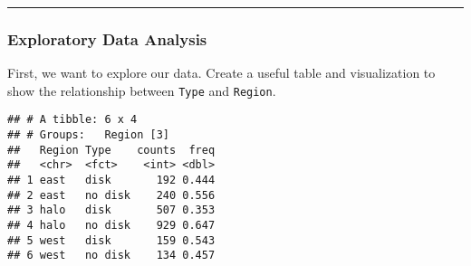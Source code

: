 \documentclass[]{article}
\newenvironment{Shaded}{\begin{snugshade}}{\end{snugshade}}
\newcommand{\CommentTok}[1]{\textcolor[rgb]{0.56,0.35,0.01}{\textit{#1}}}
\newcommand{\DataTypeTok}[1]{\textcolor[rgb]{0.13,0.29,0.53}{#1}}
\newcommand{\KeywordTok}[1]{\textcolor[rgb]{0.13,0.29,0.53}{\textbf{#1}}}
\newcommand{\NormalTok}[1]{#1}
\newcommand{\OperatorTok}[1]{\textcolor[rgb]{0.81,0.36,0.00}{\textbf{#1}}}
\newcommand{\StringTok}[1]{\textcolor[rgb]{0.31,0.60,0.02}{#1}}
\begin{document}
\begin{center}\rule{0.5\linewidth}{\linethickness}\end{center}

\hypertarget{exploratory-data-analysis}{%
\subsubsection{Exploratory Data
Analysis}\label{exploratory-data-analysis}}

First, we want to explore our data. Create a useful table and
visualization to show the relationship between \texttt{Type} and
\texttt{Region}.

\begin{Shaded}
\end{Shaded}

\begin{verbatim}
## # A tibble: 6 x 4
## # Groups:   Region [3]
##   Region Type    counts  freq
##   <chr>  <fct>    <int> <dbl>
## 1 east   disk       192 0.444
## 2 east   no disk    240 0.556
## 3 halo   disk       507 0.353
## 4 halo   no disk    929 0.647
## 5 west   disk       159 0.543
## 6 west   no disk    134 0.457
\end{verbatim}

\begin{Shaded}
\end{Shaded}
\end{document}
